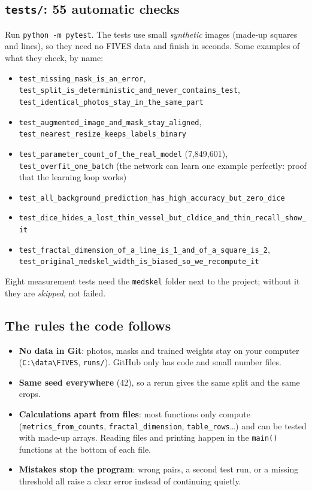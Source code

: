 \subsection{\texttt{tests/}: 55 automatic checks}
Run \texttt{python -m pytest}. The tests use small \emph{synthetic} images (made-up squares and lines), so they need no FIVES data and finish in seconds. Some examples of what they check, by name:
\begin{itemize}
  \item \nolinkurl{test_missing_mask_is_an_error}, \nolinkurl{test_split_is_deterministic_and_never_contains_test}, \nolinkurl{test_identical_photos_stay_in_the_same_part}
  \item \nolinkurl{test_augmented_image_and_mask_stay_aligned}, \nolinkurl{test_nearest_resize_keeps_labels_binary}
  \item \nolinkurl{test_parameter_count_of_the_real_model} (7{,}849{,}601), \nolinkurl{test_overfit_one_batch} (the network can learn one example perfectly: proof that the learning loop works)
  \item \nolinkurl{test_all_background_prediction_has_high_accuracy_but_zero_dice}
  \item \nolinkurl{test_dice_hides_a_lost_thin_vessel_but_cldice_and_thin_recall_show_it}
  \item \nolinkurl{test_fractal_dimension_of_a_line_is_1_and_of_a_square_is_2}, \nolinkurl{test_original_medskel_width_is_biased_so_we_recompute_it}
\end{itemize}
Eight measurement tests need the \texttt{medskel} folder next to the project; without it they are \emph{skipped}, not failed.

\subsection{The rules the code follows}
\begin{itemize}
  \item \textbf{No data in Git}: photos, masks and trained weights stay on your computer (\texttt{C:\textbackslash data\textbackslash FIVES}, \texttt{runs/}). GitHub only has code and small number files.
  \item \textbf{Same seed everywhere} (42), so a rerun gives the same split and the same crops.
  \item \textbf{Calculations apart from files}: most functions only compute (\texttt{metrics\_from\_counts}, \texttt{fractal\_dimension}, \texttt{table\_rows}\dots) and can be tested with made-up arrays. Reading files and printing happen in the \texttt{main()} functions at the bottom of each file.
  \item \textbf{Mistakes stop the program}: wrong pairs, a second test run, or a missing threshold all raise a clear error instead of continuing quietly.
\end{itemize}

